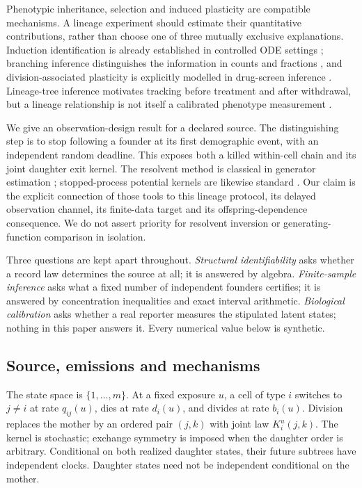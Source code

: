 \documentclass[11pt]{article}
\theoremstyle{definition}
\begin{document}
Phenotypic inheritance, selection and induced plasticity are compatible
mechanisms. A lineage experiment should estimate their quantitative
contributions, rather than choose one of three mutually exclusive explanations.
Induction identification is already established in controlled ODE settings
\citep{greene2019}; branching inference distinguishes the information in counts
and fractions \citep{gunnarsson2023}, and division-associated plasticity is
explicitly modelled in drug-screen inference \citep{wu2025}. Lineage-tree
inference motivates tracking before treatment and after withdrawal, but a
lineage relationship is not itself a calibrated phenotype measurement
\citep{mohammadi2022}.

We give an observation-design result for a declared source. The distinguishing
step is to stop following a founder at its first demographic event, with an
independent random deadline. This exposes both a killed within-cell chain and
its joint daughter exit kernel. The resolvent method is classical in generator
estimation \citep{metzner2007}; stopped-process potential kernels are likewise
standard \citep{fitzsimmons1999}. Our claim is the explicit connection of those
tools to this lineage protocol, its delayed observation channel, its finite-data
target and its offspring-dependence consequence. We do not assert priority for
resolvent inversion or generating-function comparison in isolation.

Three questions are kept apart throughout. \emph{Structural identifiability}
asks whether a record law determines the source at all; it is answered by
algebra. \emph{Finite-sample inference} asks what a fixed number of independent
founders certifies; it is answered by concentration inequalities and exact
interval arithmetic. \emph{Biological calibration} asks whether a real reporter
measures the stipulated latent states; nothing in this paper answers it. Every
numerical value below is synthetic.

\subsection{Source, emissions and mechanisms}
The state space is $\{1,\ldots,m\}$. At a fixed exposure $u$, a cell of type $i$
switches to $j\ne i$ at rate $q_{ij}(u)$, dies at rate $d_i(u)$, and divides at
rate $b_i(u)$. Division replaces the mother by an ordered pair $(j,k)$ with
joint law $K_i^u(j,k)$. The kernel is stochastic; exchange symmetry is imposed
when the daughter order is arbitrary. Conditional on both realized daughter
states, their future subtrees have independent clocks. Daughter states need not
be independent conditional on the mother.
\end{document}
